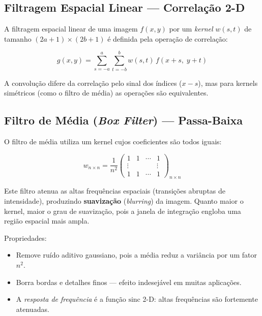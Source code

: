\documentclass[12pt,a4paper]{article}
\begin{document}
\subsection{Filtragem Espacial Linear — Correlação 2-D}

A filtragem espacial linear de uma imagem $f(x,y)$ por um \emph{kernel}
$w(s,t)$ de tamanho $(2a+1)\times(2b+1)$ é definida pela operação de
correlação:

\begin{equation}
  g(x,y) = \sum_{s=-a}^{a} \sum_{t=-b}^{b} w(s,t)\, f(x+s,\; y+t)
  \label{eq:correlation}
\end{equation}

A convolução difere da correlação pelo sinal dos índices ($x-s$), mas para
kernels simétricos (como o filtro de média) as operações são equivalentes.

\subsection{Filtro de Média (\emph{Box Filter}) — Passa-Baixa}

O filtro de média utiliza um kernel cujos coeficientes são todos iguais:

\begin{equation}
  w_{n\times n} = \frac{1}{n^2}
  \begin{pmatrix}
    1 & 1 & \cdots & 1 \\
    \vdots & & & \vdots \\
    1 & 1 & \cdots & 1
  \end{pmatrix}_{n\times n}
  \label{eq:boxfilter}
\end{equation}

Este filtro atenua as altas frequências espaciais (transições abruptas de
intensidade), produzindo \textbf{suavização} (\emph{blurring}) da imagem.
Quanto maior o kernel, maior o grau de suavização, pois a janela de
integração engloba uma região espacial mais ampla.

Propriedades:
\begin{itemize}
  \item Remove ruído aditivo gaussiano, pois a média reduz a variância
        por um fator $n^2$.
  \item Borra bordas e detalhes finos — efeito indesejável em muitas
        aplicações.
  \item A \emph{resposta de frequência} é a função $\text{sinc}$ 2-D:
        altas frequências são fortemente atenuadas.
\end{itemize}
\end{document}
